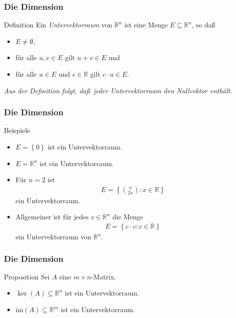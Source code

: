 \documentclass{beamer}
\title[Linadi]{\mytitle}
\author[Amin Coja-Oghlan]{Amin Coja-Oghlan}
\institute[Frankfurt]{JWGUFFM}
\date{}
\renewcommand{\emph}[1]{{\textcolor{solarizedRed}{\itshape #1}}}
\newcommand\RR{\mathbb R}
\newcommand\cbc[1]{\left\{{#1}\right\}}
\renewcommand{\ae}{\"a}
\newcommand{\ue}{\"u}
\newcommand{\im}{\mathrm{im}}
\newcommand{\mytitle}{Die Dimension}
\begin{document}
\frame[plain]{\titlepage}

\begin{frame}\frametitle{\mytitle}
	\begin{block}{Definition}
Ein \emph{Untervektorraum} von $\RR^n$ ist eine Menge $E\subseteq\RR^n$, so da\ss\
		\begin{itemize}
			\item $E\neq\emptyset$,
			\item f\ue r alle $u,v\in E$ gilt $u+v\in E$ und
			\item f\ue r alle $u\in E$ und $c\in\RR$ gilt $c\cdot u\in E$.
		\end{itemize}
	\end{block}
	{\itshape Aus der Definition folgt, da\ss\ jeder Untervektorraum den Nullvektor enth\ae lt.}
\end{frame}

\begin{frame}\frametitle{\mytitle}
	\begin{block}{Beispiele}
		\begin{itemize}
			\item $E=\cbc 0$ ist ein Untervektorraum.
			\item $E=\RR^n$ ist ein Untervektorraum.
			\item F\ue r $n=2$ ist
				\begin{align*}
					E=\cbc{\binom{x}{2x}:x\in\RR}
				\end{align*}
				ein Untervektorraum.
			\item Allgemeiner ist f\ue r jedes $v\in\RR^n$ die Menge
				\begin{align*}
					E=\cbc{c\cdot v:c\in\RR}
				\end{align*}
				ein Untervektorraum von $\RR^n$.
		\end{itemize}
	\end{block}
\end{frame}

\begin{frame}\frametitle{\mytitle}
	\begin{block}{Proposition}
		Sei $A$ eine $m\times n$-Matrix.
		\begin{itemize}
			\item $\ker(A)\subseteq\RR^n$ ist ein Untervektorraum.
			\item $\im(A)\subseteq\RR^m$ ist ein Untervektorraum.
		\end{itemize}
	\end{block}
\end{frame}
\end{document}
